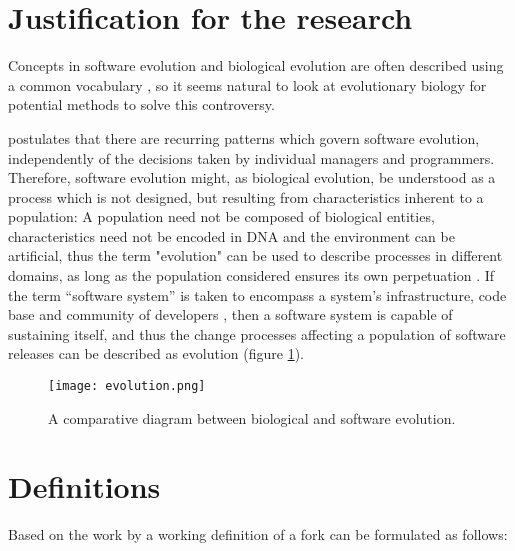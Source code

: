 
\section{Justification for the research}

Concepts in software evolution and biological evolution are often described using a common vocabulary \citep{Yu2006a}, so it seems natural to look at evolutionary biology for potential methods to solve this controversy.

\citet{Lehman1980a} postulates that there are recurring patterns which govern software evolution, independently of the decisions taken by individual managers and programmers. Therefore, software evolution might, as biological evolution, be understood as a process which is not designed, but resulting from characteristics inherent to a population: A population need not be composed of biological entities, characteristics need not be encoded in DNA and the environment can be artificial, thus the term "evolution" can be used to describe processes in different domains, as long as the population considered ensures its own perpetuation \citep{Nehaniv2006a}. If the term “software system” is taken to encompass a system's infrastructure, code base and community of developers \citep{Yu2006a}, then a software system is capable of sustaining itself, and thus the change processes affecting a population of software releases can be described as evolution (figure \ref{fig:evolution}).

\begin{figure}[H]
  \texttt{[image: evolution.png]}
  \caption{A comparative diagram between biological and software evolution.}
  \label{fig:evolution}
\end{figure}


\section{Definitions}
\label{definitions}

Based on the work by \citet{Robles2012a} a working definition of a fork can be formulated as follows:


